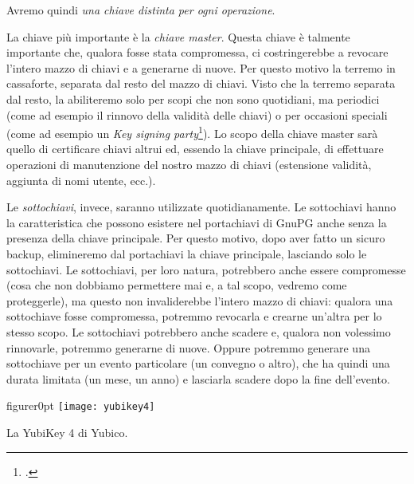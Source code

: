 Avremo quindi \emph{una chiave distinta per ogni operazione}.

La chiave più importante è la \emph{chiave master}. Questa chiave è talmente
importante che, qualora fosse stata compromessa, ci costringerebbe a revocare
l'intero mazzo di chiavi e a generarne di nuove. Per questo motivo la terremo in
cassaforte, separata dal resto del mazzo di chiavi. Visto che la terremo
separata dal resto, la abiliteremo solo per scopi che non sono quotidiani, ma
periodici (come ad esempio il rinnovo della validità delle chiavi) o per
occasioni speciali (come ad esempio un \emph{Key signing
party}\footnote{\cite{wiki:ksp}.}). Lo scopo della chiave master sarà quello di
certificare chiavi altrui ed, essendo la chiave principale, di effettuare
operazioni di manutenzione del nostro mazzo di chiavi (estensione validità,
aggiunta di nomi utente, ecc.).

Le \emph{sottochiavi}, invece, saranno utilizzate quotidianamente. Le
sottochiavi hanno la caratteristica che possono esistere nel portachiavi di
GnuPG anche senza la presenza della chiave principale. Per questo motivo, dopo
aver fatto un sicuro backup, elimineremo dal portachiavi la chiave principale,
lasciando solo le sottochiavi. Le sottochiavi, per loro natura, potrebbero anche
essere compromesse (cosa che non dobbiamo permettere mai e, a tal scopo, vedremo
come proteggerle), ma questo non invaliderebbe l'intero mazzo di chiavi: qualora
una sottochiave fosse compromessa, potremmo revocarla e crearne un'altra per lo
stesso scopo. Le sottochiavi potrebbero anche scadere e, qualora non volessimo
rinnovarle, potremmo generarne di nuove. Oppure potremmo generare una
sottochiave per un evento particolare (un convegno o altro), che ha quindi una
durata limitata (un mese, un anno) e lasciarla scadere dopo la fine dell'evento.

\begin{wrapfloat}{figure}{r}{0pt}
    \texttt{[image: yubikey4]}
    \caption{La YubiKey 4 di Yubico.}
    \label{fig:yubikey4}
\end{wrapfloat}

